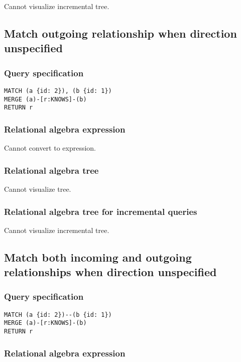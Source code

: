 Cannot visualize incremental tree.

\subsection{Match outgoing relationship when direction unspecified}

\subsubsection*{Query specification}

\begin{lstlisting}
MATCH (a {id: 2}), (b {id: 1})
MERGE (a)-[r:KNOWS]-(b)
RETURN r
\end{lstlisting}

\subsubsection*{Relational algebra expression}

Cannot convert to expression.

\subsubsection*{Relational algebra tree}

Cannot visualize tree.

\subsubsection*{Relational algebra tree for incremental queries}

Cannot visualize incremental tree.

\subsection{Match both incoming and outgoing relationships when direction unspecified}

\subsubsection*{Query specification}

\begin{lstlisting}
MATCH (a {id: 2})--(b {id: 1})
MERGE (a)-[r:KNOWS]-(b)
RETURN r
\end{lstlisting}

\subsubsection*{Relational algebra expression}

